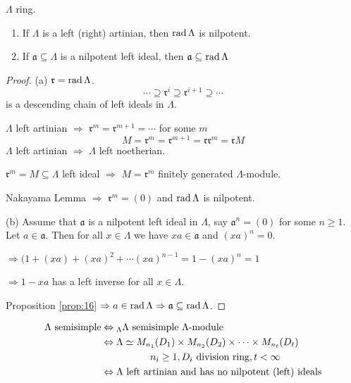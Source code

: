 \begin{lem}\label{lem:19}
$\Lambda$ ring.
\begin{enumerate}[\rm(a)]
\item If $\Lambda$ is a left (right) artinian, then $\operatorname{rad}\nolimits\Lambda$ is
  nilpotent. 
\item If $\mathfrak{a}\subseteq \Lambda$ is a nilpotent left ideal,
  then $\mathfrak{a} \subseteq \operatorname{rad}\nolimits\Lambda$
\end{enumerate}
\end{lem}
\begin{proof}
(a) $\mathfrak{r} = \operatorname{rad}\nolimits\Lambda$. 
\[\cdots \supseteq \mathfrak{r}^i \supseteq \mathfrak{r}^{i+1}
  \supseteq \cdots\]
is a descending chain of left ideals in $\Lambda$.

$\Lambda$ left artinian $\Rightarrow$ $\mathfrak{r}^m =
\mathfrak{r}^{m+1} = \cdots$ for some $m$
\[M=\mathfrak{r}^m = \mathfrak{r}^{m+1} = \mathfrak{r}\mathfrak{r}^m = \mathfrak{r}M\]
$\Lambda$ left artinian $\Rightarrow$ $\Lambda$ left noetherian.

$\mathfrak{r}^m = M \subseteq \Lambda$ left ideal $\Rightarrow$
$M=\mathfrak{r}^m$ finitely generated $\Lambda$-module.

Nakayama Lemma $\Rightarrow$ $\mathfrak{r}^m = (0)$ and $\operatorname{rad}\nolimits\Lambda$
is nilpotent.

(b)  Assume that $\mathfrak{a}$ is a nilpotent left ideal in
$\Lambda$, say $\mathfrak{a}^n = (0)$ for some $n\geq 1$.  Let $a\in
\mathfrak{a}$. Then for all $x\in\Lambda$ we have $xa\in\mathfrak{a}$
and $(xa)^n=0$.

$\Rightarrow  (1 + (xa) + (xa)^2 + \cdots (xa)^{n-1} = 1 - (xa)^n = 1$

$\Rightarrow 1 -xa$ has a left inverse for all $x\in\Lambda$.

Proposition \ref{prop:16} $\Rightarrow a\in\operatorname{rad}\nolimits\Lambda \Rightarrow
\mathfrak{a}\subseteq \operatorname{rad}\nolimits\Lambda$. 
\end{proof}

\begin{recall}
\begin{align}
\Lambda \textrm{\ semisimple}\index{ring!semisimple} & \Leftrightarrow {_\Lambda\Lambda}
                                \textrm{\ semisimple $\Lambda$-module}\notag\\
& \Leftrightarrow \Lambda\simeq M_{n_1}(D_1)\times
  M_{n_2}(D_2)\times\cdots \times M_{n_t}(D_t)\notag\\
& \hphantom{\Leftrightarrow}\qquad \qquad n_i\geq 1, D_i \textrm{\ division ring}, t
  < \infty\notag\\
& \Leftrightarrow \Lambda \textrm{\ left artinian and has no nilpotent
  (left) ideals}\notag
\end{align}
\end{recall}

